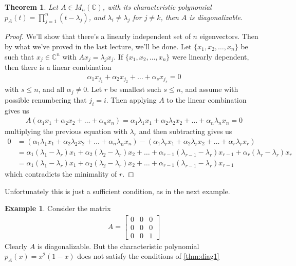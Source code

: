 \documentclass[11pt]{article}
\theoremstyle{plain} %
\newtheorem{theorem}{Theorem}[section]
\theoremstyle{definition} %
\newtheorem{example}{Example}[section]
\theoremstyle{remark} %
\begin{document}
\begin{theorem}
  \label{thm:diag1}
  Let $A \in M_n(\mathbb{C})$, with its characteristic polynomial
  $p_A(t) = \prod_{j = 1}^{n} (t - \lambda_j)$, and $\lambda_i \neq
  \lambda_j$ for $j \neq k$, then $A$ is diagonalizable.
\end{theorem}
\begin{proof}
  We'll show that there's a linearly independent set of $n$
  eigenvectors. Then by what we've proved in the last lecture, we'll
  be done. Let $\{ x_1 , x_2 , \ldots , x_n \}$ be such that $x_j \in
  \mathbb{C}^n$ with $Ax_j = \lambda_j x_j$. If $\{x_1 , x_2 , \ldots
  , x_n  \}$ were linearly dependent, then there is a linear combination
  \begin{align*}
    \alpha_1x_{j_1} + \alpha_2x_{j_2} + \ldots + \alpha_sx_{j_s} = 0
  \end{align*}
  with $s \le n$, and all $\alpha_j \neq 0$. Let $r$ be smallest such
  $s \le n$, and assume with possible renumbering that $j_i = i$.
  Then applying $ A$ to the linear combination gives us
  \begin{align*}
    A( \alpha_1x_{1} + \alpha_2x_{2} + \ldots + \alpha_nx_{n})
    =\alpha_1 \lambda_1 x_{1} + \alpha_2 \lambda_2 x_{2} + \ldots +
    \alpha_n \lambda_n x_{n}  = 0
  \end{align*}
  multiplying the previous equation with $\lambda_r$ and then
  subtracting gives us
  \begin{align*}
    0 &= (\alpha_1 \lambda_1 x_{1} + \alpha_2 \lambda_2 x_{2} +
    \ldots + \alpha_n \lambda_n x_{n}) - (\alpha_1 \lambda_r x_{1} +
    \alpha_2 \lambda_r x_{2} + \ldots + \alpha_r \lambda_r x_{r}) \\
    &= \alpha_1 (\lambda_1 - \lambda_r) x_{1} + \alpha_2 (\lambda_2 -
    \lambda_r) x_{2} + \ldots + \alpha_{r-1} (\lambda_{r-1} -
    \lambda_r) x_{r-1} + \alpha_r (\lambda_r - \lambda_r) x_{r} \\
    &= \alpha_1 (\lambda_1 - \lambda_r) x_{1} + \alpha_2 (\lambda_2 -
    \lambda_r) x_{2} + \ldots + \alpha_{r-1} (\lambda_{r-1} - \lambda_r) x_{r-1}
  \end{align*}
  which contradicts the minimality of $r$.
\end{proof}

Unfortunately this is just a sufficient condition, as in the next example.
\begin{example}
  Consider the matrix
  \begin{align*}A =
    \begin{bmatrix}%
      0 & 0 & 0\\
      0 & 0 & 0\\
      0 & 0 & 1
    \end{bmatrix}
  \end{align*}
  Clearly $A$ is diagonalizable. But the characteristic polynomial
  $p_A(x) = x^2(1-x)$ does not satisfy the conditions of \autoref{thm:diag1}
\end{example}
\end{document}
